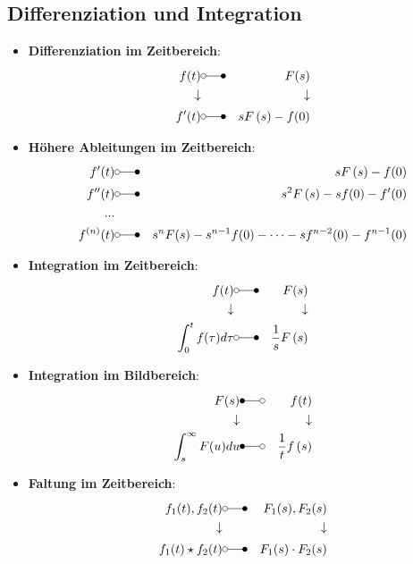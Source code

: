 \documentclass[12pt]{article}
\begin{document}
\subsection{Differenziation und Integration}
\begin{itemize}
	\item \textbf{Differenziation im Zeitbereich}:\\
			\begin{eqnarray*}
				f(t) & \laplace & F(s)\\
				\downarrow & & \downarrow \\
				f'(t) & \laplace & s F\left(s\right) -f(0)
			\end{eqnarray*}
	\item \textbf{Höhere Ableitungen im Zeitbereich}:\\
			\begin{eqnarray*}
				f'(t) & \laplace & s F\left(s\right) -f(0)\\
				f''(t) & \laplace & s^2 F\left(s\right) -sf(0)-f'(0)\\
				... & & \\
				f^{(n)}(t) & \laplace & s^nF(s)-s^{n-1}f(0)- \dotsm -sf^{n-2}(0) - f^{n-1}(0)
			\end{eqnarray*}
	\item \textbf{Integration im Zeitbereich}:\\
		 	\begin{eqnarray*}
				f(t) & \laplace & F(s)\\
				\downarrow & & \downarrow \\
				\int_0^tf(\tau)d\tau & \laplace & \frac{1}{s} F\left(s\right)
			\end{eqnarray*}
	\item \textbf{Integration im Bildbereich}:\\
		 	\begin{eqnarray*}
				F(s) & \Laplace & f(t)\\
				\downarrow & & \downarrow \\
				\int_s^\infty F(u)du & \Laplace & \frac{1}{t} f\left(s\right)
			\end{eqnarray*}
	\item \textbf{Faltung im Zeitbereich}:\\
			\begin{eqnarray*}
				f_1(t),f_2(t) & \laplace & F_1(s),F_2(s)\\
				\downarrow & & \downarrow \\
				f_1(t)\star f_2(t) & \laplace & F_1(s)\cdot F_2(s)
			\end{eqnarray*}
\end{itemize}
\end{document}
